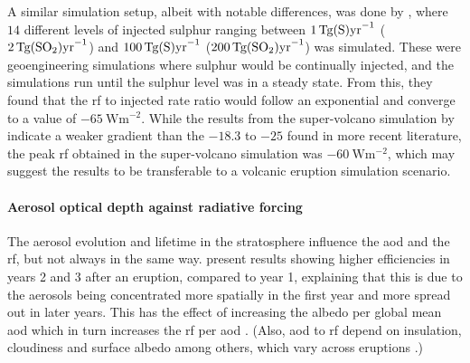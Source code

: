\documentclass{ametsocV5}
\begin{document}
A similar simulation setup, albeit with notable differences, was done by
\citet{niemeier2015}, where \(14\) different levels of injected sulphur ranging between
\(\SI{1}{\tera\gram(\ce{S})\mathrm{yr}^{-1}}\)
(\(\SI{2}{\tera\gram(\ce{SO2})\mathrm{yr}^{-1}}\)) and
\(\SI{100}{\tera\gram(\ce{S})\mathrm{yr}^{-1}}\)
(\(\SI{200}{\tera\gram(\ce{SO2})\mathrm{yr}^{-1}}\)) was simulated. These were
geoengineering simulations where sulphur would be continually injected, and the
simulations run until the sulphur level was in a steady state. From this, they found
that the \ac{rf} to injected rate ratio would follow an exponential and converge to a
value of \(\SI{-65}{\watt\metre^{-2}}\). While the results from the super-volcano
simulation by \citet{jones2005} indicate a weaker gradient than the \(-18.3\) to \(-25\)
found in more recent literature, the peak \ac{rf} obtained in the super-volcano
simulation was \(\SI{-60}{\watt\metre^{-2}}\), which may suggest the
\citet{niemeier2015} results to be transferable to a volcanic eruption simulation
scenario.

\paragraph*{Aerosol optical depth against radiative forcing}

The aerosol evolution and lifetime in the stratosphere influence the \ac{aod} and the
\ac{rf}, but not always in the same way. \citet{marshall2020} present results showing
higher efficiencies in years 2 and 3 after an eruption, compared to year 1, explaining
that this is due to the aerosols being concentrated more spatially in the first year and
more spread out in later years. This has the effect of increasing the albedo per global
mean \ac{aod} which in turn increases the \ac{rf} per \ac{aod} \citep{marshall2020}.
(Also, \ac{aod} to \ac{rf} depend on insulation, cloudiness and surface albedo among
others, which vary across eruptions \citep{marshall2021,andersson2015}.)

\end{document}
